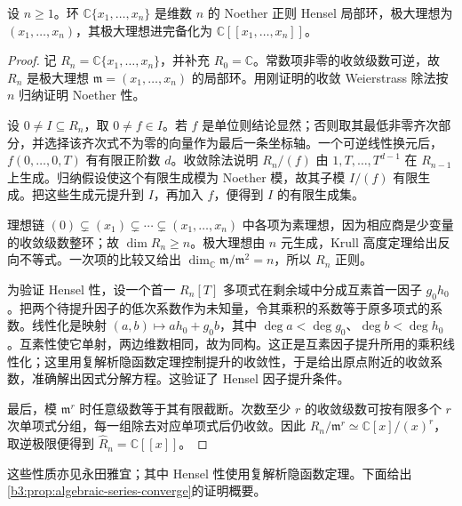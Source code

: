 \begin{corollary}[收敛幂级数环的基本性质]\label{b3:cor:analytic-series-local-properties}
	设 \(n\ge1\)。环 \(\mathbb C\{x_1,\ldots,x_n\}\) 是维数 \(n\) 的 Noether 正则 Hensel 局部环，极大理想为 \((x_1,\ldots,x_n)\)，其极大理想进完备化为 \(\mathbb C[\![x_1,\ldots,x_n]\!]\)。
\end{corollary}
\begin{proof}
	记 \(R_n=\mathbb C\{x_1,\ldots,x_n\}\)，并补充 \(R_0=\mathbb C\)。常数项非零的收敛级数可逆，故 \(R_n\) 是极大理想 \(\mathfrak m=(x_1,\ldots,x_n)\) 的局部环。用刚证明的收敛 Weierstrass 除法按 \(n\) 归纳证明 Noether 性。

	设 \(0\ne I\subseteq R_n\)，取 \(0\ne f\in I\)。若 \(f\) 是单位则结论显然；否则取其最低非零齐次部分，并选择该齐次式不为零的向量作为最后一条坐标轴。一个可逆线性换元后，\(f(0,\ldots,0,T)\) 有有限正阶数 \(d\)。收敛除法说明 \(R_n/(f)\) 由 \(1,T,\ldots,T^{d-1}\) 在 \(R_{n-1}\) 上生成。归纳假设使这个有限生成模为 Noether 模，故其子模 \(I/(f)\) 有限生成。把这些生成元提升到 \(I\)，再加入 \(f\)，便得到 \(I\) 的有限生成集。

	理想链 \((0)\subsetneq(x_1)\subsetneq\cdots\subsetneq(x_1,\ldots,x_n)\) 中各项为素理想，因为相应商是少变量的收敛级数整环；故 \(\dim R_n\ge n\)。极大理想由 \(n\) 元生成，Krull 高度定理给出反向不等式。一次项的比较又给出 \(\dim_{\mathbb C}\mathfrak m/\mathfrak m^2=n\)，所以 \(R_n\) 正则。

	为验证 Hensel 性，设一个首一 \(R_n[T]\) 多项式在剩余域中分成互素首一因子 \(g_0h_0\)。把两个待提升因子的低次系数作为未知量，令其乘积的系数等于原多项式的系数。线性化是映射 \((a,b)\mapsto ah_0+g_0b\)，其中 \(\deg a<\deg g_0\)、\(\deg b<\deg h_0\)。互素性使它单射，两边维数相同，故为同构。这正是互素因子提升所用的乘积线性化；这里用复解析隐函数定理控制提升的收敛性，于是给出原点附近的收敛系数，准确解出因式分解方程。这验证了 Hensel 因子提升条件。

	最后，模 \(\mathfrak m^r\) 时任意级数等于其有限截断。次数至少 \(r\) 的收敛级数可按有限多个 \(r\) 次单项式分组，每一组除去对应单项式后仍收敛。因此 \(R_n/\mathfrak m^r\simeq\mathbb C[x]/(x)^r\)，取逆极限便得到 \(\widehat R_n=\mathbb C[\![x]\!]\)。
\end{proof}

这些性质亦见永田雅宜\cite[(45.5), pp. 193--194]{Nagata1975LocalRings}；其中 Hensel 性使用复解析隐函数定理。下面给出\cref{b3:prop:algebraic-series-converge}的证明概要。

